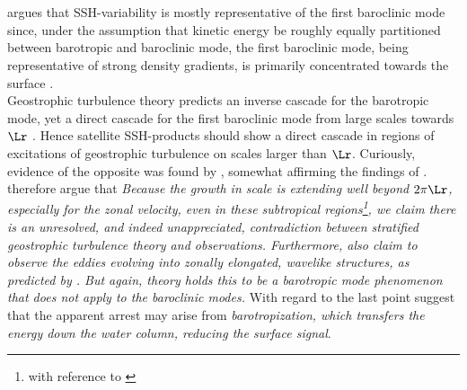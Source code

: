 \section*{\citealt{scott2005direct}}\label{sec:hist_wang}
\cite{wunsch1996ocean} argues that SSH-variability is mostly representative of
the first baroclinic mode since, under the assumption that kinetic energy be
roughly equally partitioned between barotropic and baroclinic mode, the first
baroclinic mode, being representative of strong density gradients, is primarily
concentrated towards the surface \citep{scott2005direct}.\\
Geostrophic turbulence theory predicts an inverse cascade for the barotropic mode, yet a direct cascade for the first baroclinic mode from large scales towards $\Lr$ \citep{vallis2006atmospheric}  . Hence satellite SSH-products should show a direct cascade in regions of excitations of geostrophic turbulence on scales larger than $\Lr$.
Curiously, evidence of the opposite was found by \eg \cite{tapley1994accuracy,Kobashi2002}, somewhat affirming the findings of \cite{larichev1995eddy}. \cite{scott2005direct} therefore argue that \textit{Because the growth in scale is extending well beyond $2\pi\Lr$, especially for the zonal velocity, even in these subtropical regions\footnote{with reference to \cite{Kobashi2002}}, we claim there is an unresolved, and indeed unappreciated, contradiction between stratified geostrophic turbulence theory and observations. Furthermore, \cite{Kobashi2002} also claim to observe the eddies evolving into zonally elongated, wavelike structures, as predicted by \cite{Rhines2006}. But again, theory holds this to be a barotropic mode phenomenon that does not apply to the baroclinic modes.}
With regard to the last point \cite{scott2005direct} suggest that the apparent arrest may arise from \textit{barotropization, which transfers the energy down the water column, reducing the surface signal}. 

